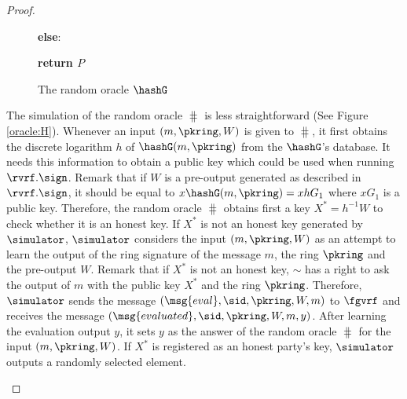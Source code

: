 \begin{proof}
\begin{itemize}
\begin{figure}
{{					
					
					
					
					
					\textbf{else}:
					
					
					
					\textbf{return $ P $}
					
			}}	
			\caption{The random oracle $ \hashG $}
			\label{oracle:Hg}
		\end{figure}
		
		The simulation of the random oracle $ \hash $ is less straightforward (See Figure \ref{oracle:H}). Whenever an input $ (m, \pkring, W) $ is given to $ \hash $, it first obtains the discrete logarithm $ h $ of $ \hashG(m, \pkring) $ from the $ \hashG $'s database. It needs this information to obtain a public key  which could be used when running $ \rvrf.\sign $. Remark that if $ W $ is a pre-output generated as described in $ \rvrf.\sign $, it should be equal to $ x\hashG(m, \pkring)= xhG_1 $  where $ xG_1 $ is a public key. Therefore, the random oracle $ \hash $ obtains first  a  key $ X^* = h^{-1}W $ to check whether it is an honest key. 
		If $ X^*$ is not an honest key generated by $ \simulator $, $ \simulator $ considers the input $ (m,\pkring,W) $ as an attempt to learn the output of the ring signature of the message $ m $, the ring $ \pkring $ and the pre-output $ W $.
		Remark that if $ X^* $ is not an honest key, $ \sim $ has a right to ask the output of $ m $ with the public key $ X^* $ and the ring $ \pkring $. Therefore, $ \simulator $ sends the message $ (\msg{eval}, \sid, \pkring,W,m) $ to $ \fgvrf $ and receives the message $ (\msg{evaluated}, \sid, \pkring,W,m,y) $.
		After learning the evaluation output $ y $, it sets $ y $ as the answer of the random oracle $ \hash $  for the input $ (m, \pkring, W) $. 
		If $ X^* $ is registered as an honest party's key, $ \simulator $ outputs a randomly selected element. 
		

\end{itemize}
\end{proof}

